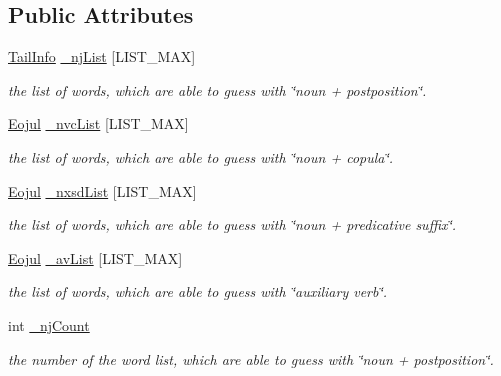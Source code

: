 \subsection*{Public Attributes}
\begin{CompactItemize}
\item 
\hyperlink{classTailInfo}{TailInfo} \hyperlink{classGuessCandidate_2622d5a2c762087031cbe91489bb49cd}{\_\-njList} \mbox{[}LIST\_\-MAX\mbox{]}
\begin{CompactList}\small\item\em the list of words, which are able to guess with \char`\"{}noun + postposition\char`\"{}. \item\end{CompactList}\item 
\hyperlink{classkmaOrange_1_1Eojul}{Eojul} \hyperlink{classGuessCandidate_03874c97800c94410000fabce43caa7b}{\_\-nvcList} \mbox{[}LIST\_\-MAX\mbox{]}
\begin{CompactList}\small\item\em the list of words, which are able to guess with \char`\"{}noun + copula\char`\"{}. \item\end{CompactList}\item 
\hyperlink{classkmaOrange_1_1Eojul}{Eojul} \hyperlink{classGuessCandidate_8eb000c2b7f13f2f2330346bdee6e652}{\_\-nxsdList} \mbox{[}LIST\_\-MAX\mbox{]}
\begin{CompactList}\small\item\em the list of words, which are able to guess with \char`\"{}noun + predicative suffix\char`\"{}. \item\end{CompactList}\item 
\hyperlink{classkmaOrange_1_1Eojul}{Eojul} \hyperlink{classGuessCandidate_4eed8fd03e0f6d778e0ad6858dec266a}{\_\-avList} \mbox{[}LIST\_\-MAX\mbox{]}
\begin{CompactList}\small\item\em the list of words, which are able to guess with \char`\"{}auxiliary verb\char`\"{}. \item\end{CompactList}\item 
int \hyperlink{classGuessCandidate_049a1704663dcfc0a4584c15f088500f}{\_\-njCount}
\begin{CompactList}\small\item\em the number of the word list, which are able to guess with \char`\"{}noun + postposition\char`\"{}. \item\end{CompactList}\item 

\end{CompactItemize}
